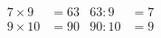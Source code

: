 \documentclass{article}
\begin{document}
\vspace*{\fill} \vspace*{-5ex}
\begin{align}
7\times 9& =63 & 63:9& =7\\
9\times 10& =90 & 90:10& =9
\end{align}
\vspace*{\fill}
\end{document}
